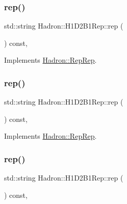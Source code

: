 \subsubsection{\texorpdfstring{rep()}{rep()}\hspace{0.1cm}{\footnotesize\ttfamily [2/5]}}
{\footnotesize\ttfamily std\+::string Hadron\+::\+H1\+D2\+B1\+Rep\+::rep (\begin{DoxyParamCaption}{ }\end{DoxyParamCaption}) const\hspace{0.3cm}{\ttfamily [inline]}, {\ttfamily [virtual]}}



Implements \mbox{\hyperlink{structHadron_1_1RepRep_ab3213025f6de249f7095892109575fde}{Hadron\+::\+Rep\+Rep}}.

\mbox{\label{structHadron_1_1H1D2B1Rep_a4728e19334216fe0a85733f3356d8716}} 
\subsubsection{\texorpdfstring{rep()}{rep()}\hspace{0.1cm}{\footnotesize\ttfamily [3/5]}}
{\footnotesize\ttfamily std\+::string Hadron\+::\+H1\+D2\+B1\+Rep\+::rep (\begin{DoxyParamCaption}{ }\end{DoxyParamCaption}) const\hspace{0.3cm}{\ttfamily [inline]}, {\ttfamily [virtual]}}



Implements \mbox{\hyperlink{structHadron_1_1RepRep_ab3213025f6de249f7095892109575fde}{Hadron\+::\+Rep\+Rep}}.

\mbox{\label{structHadron_1_1H1D2B1Rep_a4728e19334216fe0a85733f3356d8716}} 
\subsubsection{\texorpdfstring{rep()}{rep()}\hspace{0.1cm}{\footnotesize\ttfamily [4/5]}}
{\footnotesize\ttfamily std\+::string Hadron\+::\+H1\+D2\+B1\+Rep\+::rep (\begin{DoxyParamCaption}{ }\end{DoxyParamCaption}) const\hspace{0.3cm}{\ttfamily [inline]}, {\ttfamily [virtual]}}



